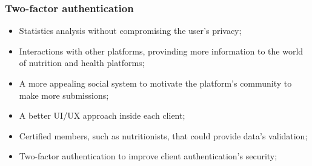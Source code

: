 \subsubsection{Two-factor authentication}


\begin{itemize}
    \item Statistics analysis without compromising the user's privacy;
    \item Interactions with other platforms, provinding more information to the world of nutrition and health platforms;
    \item A more appealing social system to motivate the platform's community to make more submissions;
    \item A better UI/UX approach inside each client;
    \item Certified members, such as nutritionists, that could provide data's validation;
    \item Two-factor authentication to improve client authentication's security;
\end{itemize}
